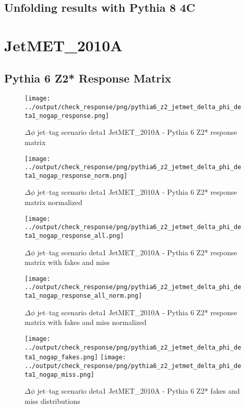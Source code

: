 \documentclass[11pt]{book}
\begin{document}
\clearpage
\subsection{Unfolding results with Pythia 8 4C}


\section{JetMET\_2010A}
\subsection{Pythia 6 Z2* Response Matrix}

\begin{figure}[ht]
\centering
\texttt{[image: ../output/check\_response/png/pythia6\_z2\_jetmet\_delta\_phi\_deta1\_nogap\_response.png]}
\caption{$\Delta\phi$ jet--tag scenario deta1 JetMET\_2010A - Pythia 6 Z2* response matrix}
\label{p6_jetmet_delta_phi_deta1_nogap_response}
\end{figure}

\begin{figure}[ht]
\centering
\texttt{[image: ../output/check\_response/png/pythia6\_z2\_jetmet\_delta\_phi\_deta1\_nogap\_response\_norm.png]}
\caption{$\Delta\phi$ jet--tag scenario deta1 JetMET\_2010A - Pythia 6 Z2* response matrix normalized}
\label{p6_jetmet_delta_phi_deta1_nogap_response_norm}
\end{figure}

\begin{figure}[ht]
\centering
\texttt{[image: ../output/check\_response/png/pythia6\_z2\_jetmet\_delta\_phi\_deta1\_nogap\_response\_all.png]}
\caption{$\Delta\phi$ jet--tag scenario deta1 JetMET\_2010A - Pythia 6 Z2* response matrix with fakes and miss}
\label{p6_jetmet_delta_phi_deta1_nogap_response_all}
\end{figure}

\begin{figure}[ht]
\centering
\texttt{[image: ../output/check\_response/png/pythia6\_z2\_jetmet\_delta\_phi\_deta1\_nogap\_response\_all\_norm.png]}
\caption{$\Delta\phi$ jet--tag scenario deta1 JetMET\_2010A - Pythia 6 Z2* response matrix with fakes and miss normalized}
\label{p6_jetmet_delta_phi_deta1_nogap_response_all_norm}
\end{figure}

\begin{figure}[ht]
\centering
\texttt{[image: ../output/check\_response/png/pythia6\_z2\_jetmet\_delta\_phi\_deta1\_nogap\_fakes.png]}
\texttt{[image: ../output/check\_response/png/pythia6\_z2\_jetmet\_delta\_phi\_deta1\_nogap\_miss.png]}
\caption{$\Delta\phi$ jet--tag scenario deta1 JetMET\_2010A - Pythia 6 Z2* fakes and miss distributions}
\label{p6_jetmet_delta_phi_deta1_nogap_fakesmiss}
\end{figure}
\end{document}
